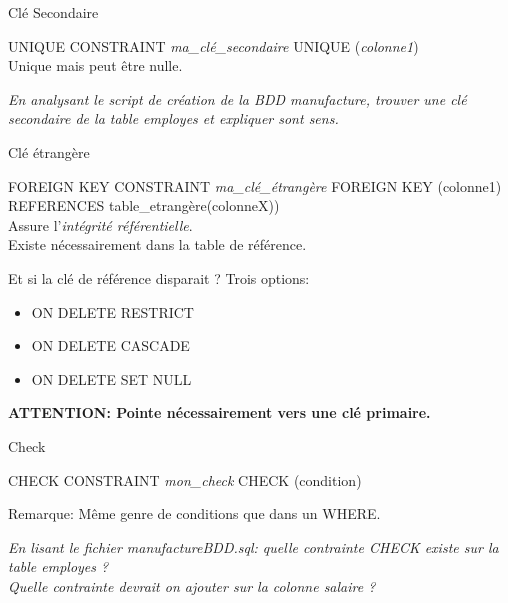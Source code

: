 \documentclass[dvipsnames]{beamer}
\begin{document}
\begin{frame}{Clé Secondaire}
	\begin{alertblock}{UNIQUE}
		CONSTRAINT \textit{ma\_clé\_secondaire} UNIQUE (\textit{colonne1})\\
		Unique mais peut être nulle.
	\end{alertblock}
	
\begin{scriptsize}
			\textit{En analysant le script de création de la BDD manufacture, trouver une clé secondaire de la table employes et expliquer sont sens.}\\
\end{scriptsize}		
\end{frame}

\begin{frame}{Clé étrangère}
	\begin{alertblock}{FOREIGN KEY}
		CONSTRAINT \textit{ma\_clé\_étrangère} FOREIGN KEY (colonne1) REFERENCES table\_etrangère(colonneX))\\
		Assure l'\textit{intégrité référentielle}.\\
		Existe nécessairement dans la table de référence.
	\end{alertblock}
	\begin{block}{Et si la clé de référence disparait ?}
		Trois options:
		\begin{itemize}
			\item ON DELETE RESTRICT
			\item ON DELETE CASCADE
			\item ON DELETE SET NULL
		\end{itemize}
		\textbf{ATTENTION: Pointe nécessairement vers une clé primaire.}				
	\end{block}
\end{frame}


\begin{frame}{Check}
	\begin{alertblock}{CHECK}
		CONSTRAINT \textit{mon\_check} CHECK (condition)\\
	\end{alertblock}
	Remarque: Même genre de conditions que dans un WHERE.\\
	\vspace*{1em}
\begin{scriptsize}
	\textit{En lisant le fichier manufactureBDD.sql: quelle contrainte CHECK existe sur la table employes ?}\\
	\textit{Quelle contrainte devrait on ajouter sur la colonne salaire ?}\\
\end{scriptsize}
\end{frame}
\end{document}
